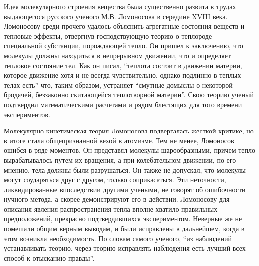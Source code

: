 Идея молекулярного строения вещества была существенно развита в трудах выдающегося русского ученого М.В. Ломоносова в середине XVIII века.
Ломоносову среди прочего удалось объяснить агрегатные состояния веществ и тепловые эффекты, отвергнув господствующую теорию о теплороде - специальной субстанции, порождающей тепло.
Он пришел к заключению, что молекулы должны находиться в непрерывном движении, что и определяет тепловое состояние тел.
Как он писал, ``теплота состоит в движении материи, которое движение хотя и не всегда чувствительно, однако подлинно в теплых телах есть'' что, таким образом, устраняет ``смутные домыслы о некоторой бродячей, беззаконно скитающейся теплотворной материи''.
Свою теорию ученый подтвердил математическими расчетами и рядом блестящих для того времени экспериментов.

Молекулярно-кинетическая теория Ломоносова подвергалась жесткой критике, но в итоге стала общепризнанной вехой в атомизме.
Тем не менее, Ломоносов ошибся в ряде моментов.
Он представял молекулы шарообразными, причем тепло вырабатывалось путем их вращения, а при колебательном движении, по его мнению, тела должны были разрушаться. 
Он также не допускал, что молекулы могут соударяться друг с другом, только соприкасаться.
Эти неточности, ликвидированные впоследствии другими учеными, не говорят об ошибочности нучного метода, а скорее демонстрируют его в действии.
Ломоносову для описания явления распространения тепла вполне хватило правильных предположений, прекрасно подтвердившихся экспериментом.
Неверные же не помешали общим верным выводам, и были исправлены в дальнейшем, когда в этом возникла необходимость.
По словам самого ученого, ``из наблюдений устанавливать теорию, через теорию исправлять наблюдения есть лучший всех способ к отысканию правды''.

